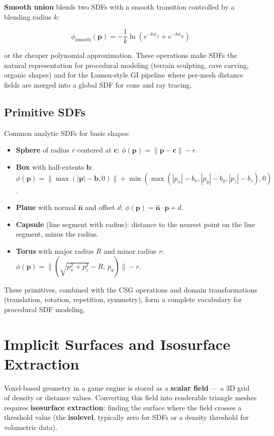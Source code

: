 \documentclass[
  11pt,
  letterpaper,
  DIV=11,
  numbers=noendperiod,
  twoside,
  open=right]{scrreprt}
\providecommand{\tightlist}{%
  \setlength{\itemsep}{0pt}\setlength{\parskip}{0pt}}
\begin{document}
\textbf{Smooth union} blends two SDFs with a smooth transition
controlled by a blending radius \(k\):

\[
\phi_{\text{smooth}}(\mathbf{p}) = -\frac{1}{k} \ln(e^{-k\phi_A} + e^{-k\phi_B})
\]

or the cheaper polynomial approximation. These operations make SDFs the
natural representation for procedural modeling (terrain sculpting, cave
carving, organic shapes) and for the Lumen-style GI pipeline where
per-mesh distance fields are merged into a global SDF for cone and ray
tracing.

\subsection{Primitive SDFs}\label{primitive-sdfs}

Common analytic SDFs for basic shapes:

\begin{itemize}
\tightlist
\item
  \textbf{Sphere} of radius \(r\) centered at \(\mathbf{c}\):
  \(\phi(\mathbf{p}) = \|\mathbf{p} - \mathbf{c}\| - r\).
\item
  \textbf{Box} with half-extents \(\mathbf{b}\):
  \(\phi(\mathbf{p}) = \|\max(|\mathbf{p}| - \mathbf{b}, 0)\| + \min(\max(|p_x| - b_x, |p_y| - b_y, |p_z| - b_z), 0)\).
\item
  \textbf{Plane} with normal \(\hat{\mathbf{n}}\) and offset \(d\):
  \(\phi(\mathbf{p}) = \hat{\mathbf{n}} \cdot \mathbf{p} + d\).
\item
  \textbf{Capsule} (line segment with radius): distance to the nearest
  point on the line segment, minus the radius.
\item
  \textbf{Torus} with major radius \(R\) and minor radius \(r\):
  \(\phi(\mathbf{p}) = \|(\sqrt{p_x^2 + p_z^2} - R, \, p_y)\| - r\).
\end{itemize}

These primitives, combined with the CSG operations and domain
transformations (translation, rotation, repetition, symmetry), form a
complete vocabulary for procedural SDF modeling.

\section{Implicit Surfaces and Isosurface
Extraction}\label{implicit-surfaces-and-isosurface-extraction}

Voxel-based geometry in a game engine is stored as a \textbf{scalar
field} --- a 3D grid of density or distance values. Converting this
field into renderable triangle meshes requires \textbf{isosurface
extraction}: finding the surface where the field crosses a threshold
value (the \textbf{isolevel}, typically zero for SDFs or a density
threshold for volumetric data).
\end{document}

